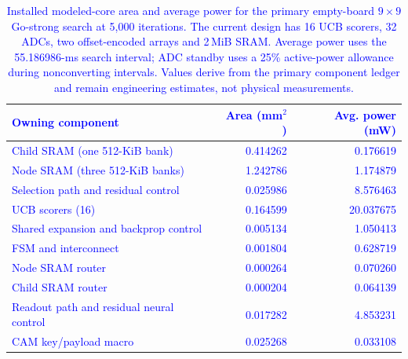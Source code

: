 \begin{table}[t]
\centering
\caption{\textcolor{blue}{Installed modeled-core area and average power for the primary empty-board $9\times9$ Go-strong search at 5{,}000 iterations. The current design has 16 UCB scorers, 32 ADCs, two offset-encoded arrays and 2\,MiB SRAM. Average power uses the 55.186986-ms search interval; ADC standby uses a 25\% active-power allowance during nonconverting intervals. Values derive from the primary component ledger and remain engineering estimates, not physical measurements.}}
\label{tab:supp_validation_status}
\small
\setlength{\tabcolsep}{4pt}
\begin{tabular*}{\textwidth}{@{\extracolsep{\fill}}lrr@{}}
\toprule
\textcolor{blue}{\textbf{Owning component}} & \textcolor{blue}{\textbf{Area (mm$^2$)}} & \textcolor{blue}{\textbf{Avg. power (mW)}} \\
\midrule
\textcolor{blue}{Child SRAM (one 512-KiB bank)} & \textcolor{blue}{0.414262} & \textcolor{blue}{0.176619} \\
\textcolor{blue}{Node SRAM (three 512-KiB banks)} & \textcolor{blue}{1.242786} & \textcolor{blue}{1.174879} \\
\textcolor{blue}{Selection path and residual control} & \textcolor{blue}{0.025986} & \textcolor{blue}{8.576463} \\
\textcolor{blue}{UCB scorers (16)} & \textcolor{blue}{0.164599} & \textcolor{blue}{20.037675} \\
\textcolor{blue}{Shared expansion and backprop control} & \textcolor{blue}{0.005134} & \textcolor{blue}{1.050413} \\
\textcolor{blue}{FSM and interconnect} & \textcolor{blue}{0.001804} & \textcolor{blue}{0.628719} \\
\textcolor{blue}{Node SRAM router} & \textcolor{blue}{0.000264} & \textcolor{blue}{0.070260} \\
\textcolor{blue}{Child SRAM router} & \textcolor{blue}{0.000204} & \textcolor{blue}{0.064139} \\
\textcolor{blue}{Readout path and residual neural control} & \textcolor{blue}{0.017282} & \textcolor{blue}{4.853231} \\
\textcolor{blue}{CAM key/payload macro} & \textcolor{blue}{0.025268} & \textcolor{blue}{0.033108} \\

\end{tabular*}
\end{table}
